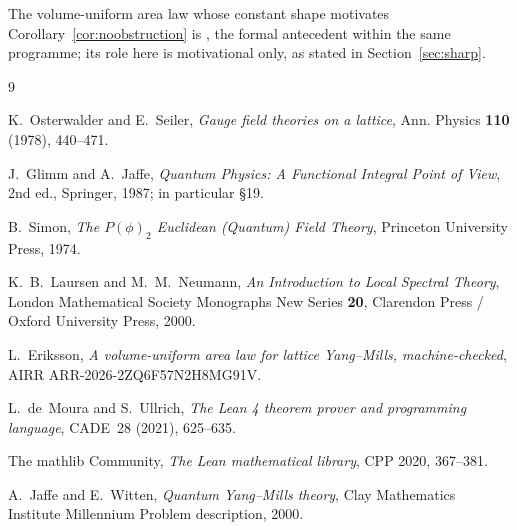 \documentclass[11pt]{article}
\theoremstyle{definition}
\begin{document}
The volume-uniform area law whose constant shape motivates
Corollary~\ref{cor:noobstruction} is \cite{ErikssonAreaLaw}, the formal
antecedent within the same programme; its role here is motivational only,
as stated in Section~\ref{sec:sharp}.

\begin{thebibliography}{9}

K.~Osterwalder and E.~Seiler,
\emph{Gauge field theories on a lattice},
Ann. Physics \textbf{110} (1978), 440--471.

J.~Glimm and A.~Jaffe,
\emph{Quantum Physics: A Functional Integral Point of View},
2nd ed., Springer, 1987; in particular \S19.

B.~Simon,
\emph{The $P(\phi)_2$ Euclidean (Quantum) Field Theory},
Princeton University Press, 1974.

K.~B.~Laursen and M.~M.~Neumann,
\emph{An Introduction to Local Spectral Theory},
London Mathematical Society Monographs New Series \textbf{20},
Clarendon Press / Oxford University Press, 2000.

L.~Eriksson,
\emph{A volume-uniform area law for lattice Yang--Mills, machine-checked},
AIRR ARR-2026-2ZQ6F57N2H8MG91V.

L.~de~Moura and S.~Ullrich,
\emph{The Lean 4 theorem prover and programming language},
CADE~28 (2021), 625--635.

The mathlib Community,
\emph{The Lean mathematical library},
CPP 2020, 367--381.

A.~Jaffe and E.~Witten,
\emph{Quantum Yang--Mills theory},
Clay Mathematics Institute Millennium Problem description, 2000.

\end{thebibliography}
\end{document}
